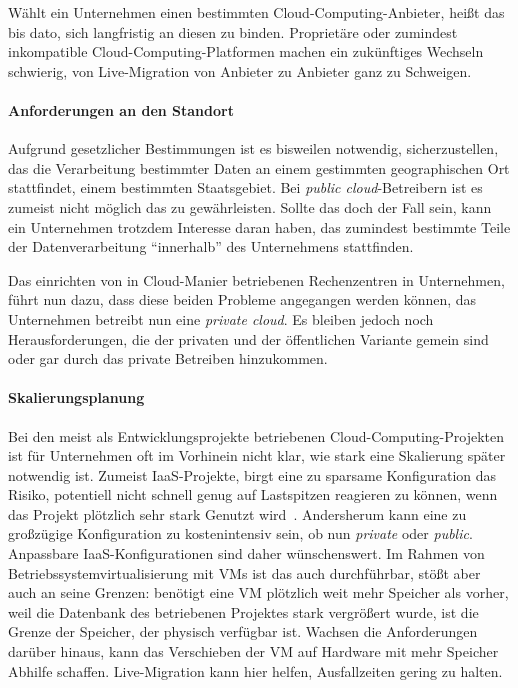 Wählt ein Unternehmen einen bestimmten Cloud-Computing-Anbieter, heißt
das bis dato, sich langfristig an diesen zu binden. Proprietäre oder
zumindest inkompatible Cloud-Computing-Platformen machen ein
zukünftiges Wechseln schwierig, von Live-Migration von Anbieter zu
Anbieter ganz zu Schweigen. 

\paragraph*{Anforderungen an den Standort}
\label{sec:anforderungen-an-den}

Aufgrund gesetzlicher Bestimmungen ist es bisweilen notwendig,
sicherzustellen, das die Verarbeitung bestimmter Daten an einem
gestimmten geographischen Ort stattfindet, \zB einem bestimmten
Staatsgebiet. Bei \emph{public cloud}-Betreibern ist es zumeist nicht
möglich das zu gewährleisten. Sollte das doch der Fall sein, kann ein
Unternehmen trotzdem Interesse daran haben, das zumindest bestimmte
Teile der Datenverarbeitung "`innerhalb"' des Unternehmens
stattfinden.

\medskip

Das einrichten von in Cloud-Manier betriebenen Rechenzentren in
Unternehmen, führt nun dazu, dass diese beiden Probleme angegangen
werden können, das Unternehmen betreibt nun eine \emph{private cloud}.
Es bleiben jedoch noch Herausforderungen, die der privaten und der
öffentlichen Variante gemein sind oder gar durch das private Betreiben
hinzukommen.~\cite{Schwarzer2010:Cloud-Hype-Tren}

\paragraph*{Skalierungsplanung}
\label{sec:skalierungsplanung}

Bei den meist als Entwicklungsprojekte betriebenen
Cloud-Computing-Projekten ist für Unternehmen oft im Vorhinein nicht
klar, wie stark eine Skalierung später notwendig ist. Zumeist
\ac{IaaS}-Projekte, birgt eine zu sparsame Konfiguration das Risiko,
potentiell nicht schnell genug auf Lastspitzen reagieren zu können,
wenn das Projekt plötzlich sehr stark Genutzt wird~\cite{whoever1}.
Andersherum kann eine zu großzügige Konfiguration zu kostenintensiv
sein, ob nun \emph{private} oder \emph{public}. Anpassbare
\ac{IaaS}-Konfigurationen sind daher wünschenswert. Im Rahmen von
Betriebssystemvirtualisierung mit \acfp{VM} ist das auch durchführbar,
stößt aber auch an seine Grenzen: benötigt eine \ac{VM} plötzlich weit
mehr Speicher als vorher, weil \zB die Datenbank des betriebenen
Projektes stark vergrößert wurde, ist die Grenze der Speicher, der
physisch verfügbar ist. Wachsen die Anforderungen darüber hinaus, kann
das Verschieben der \ac{VM} auf Hardware mit mehr Speicher Abhilfe
schaffen. Live-Migration kann hier helfen, Ausfallzeiten gering zu
halten.


